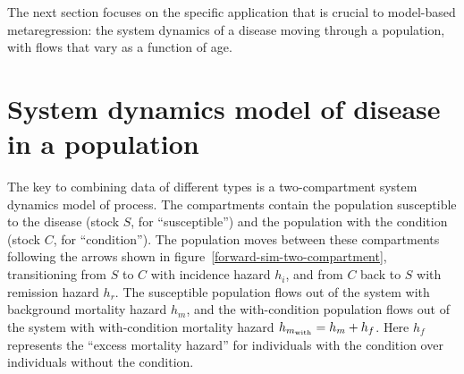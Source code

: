 








The next section focuses on the specific application that is crucial to
model-based metaregression: the system dynamics of a disease moving
through a population, with flows that vary as a function of age.

\section{System dynamics model of disease in a population}
\label{sys-dynamics}
The key to combining data of different types is a two-compartment
system dynamics model of process. The compartments contain the
population susceptible to the disease (stock $S$, for ``susceptible'')
and the population with the condition (stock $C$, for
``condition''). The population moves between these compartments
following the arrows shown in
figure~\ref{forward-sim-two-compartment}, transitioning from $S$ to
$C$ with incidence hazard $h_i$, and from $C$ back to $S$ with
remission hazard $h_r$. The susceptible population flows out of the
system with background mortality hazard $h_m$, and the with-condition
population flows out of the system with with-condition mortality
hazard $h_{m_{\text{with}}} = h_m+h_f$.  Here $h_f$ represents the ``excess
mortality hazard'' for individuals with the condition over individuals
without the condition.\cite{barendregt_generic_2003}

